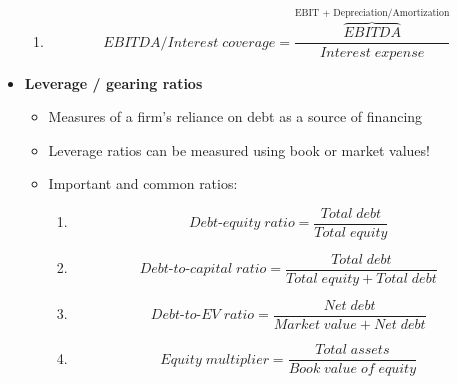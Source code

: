 \documentclass[ieeetran]{article}
\begin{document}
\begin{itemize}
\begin{enumerate}
	    \item
	    \large
	    \begin{equation*}
		    \boxed{EBITDA/Interest \; coverage = \frac{\overbrace{EBITDA}^\text{EBIT + Depreciation/Amortization}}{Interest \; expense}}
	    \end{equation*}
	    \normalsize
	  \end{enumerate}

\item \textbf{Leverage / gearing ratios}
	\begin{itemize}
		\item Measures of a firm's reliance on debt as a source of financing
		\item Leverage ratios can be measured using book or market values!
          	\item Important and common ratios:
			\begin{enumerate}
	    			\item
	    			\large
	    			\begin{equation*}
					\boxed{Debt\text{-}equity \; ratio = \frac{Total \; debt}{Total \; equity}}
	   			\end{equation*}
	    			\normalsize 
				 
	    			\item
	    			\large
	    			\begin{equation*}
					\boxed{Debt\text{-}to\text{-}capital \; ratio = \frac{Total \; debt}{Total \; equity + Total \; debt}}
	   			\end{equation*}
	    			\normalsize

	    			\item
	    			\large
	    			\begin{equation*}
					\boxed{Debt\text{-}to\text{-}EV \; ratio = \frac{Net \; debt}{Market \; value + Net \; debt}}
	   			\end{equation*}
	    			\normalsize

	    			\item
	    			\large
	    			\begin{equation*}
					\boxed{Equity \; multiplier = \frac{Total \; assets}{Book \; value \; of \; equity}}
	   			\end{equation*}
	    			\normalsize
			\end{enumerate}
	\end{itemize}


\end{itemize}
\end{document}
